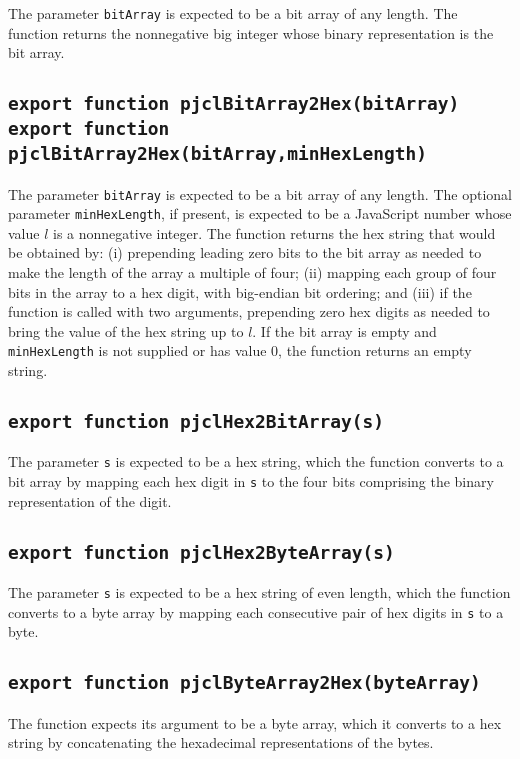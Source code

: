 \documentclass[12pt]{article}
\begin{document}
The parameter {\tt bitArray} is expected to be a bit array of any length.  The
function returns the nonnegative big integer whose binary representation is the
bit array.

\subsection{\tt export function pjclBitArray2Hex(bitArray)\\export function pjclBitArray2Hex(bitArray,minHexLength)}

The parameter {\tt bitArray} is expected to be a bit array of any length.  
The optional parameter {\tt minHexLength}, if present, is expected to be a JavaScript
number whose value $l$ is a nonnegative integer.  The
function returns the hex string that would be obtained by: (i) prepending leading zero
bits to the bit array as needed to make the length of the array a
multiple of four; (ii) mapping each group of four bits in the array to a hex digit,
with big-endian bit ordering; and (iii) if the function is called with two arguments,
prepending zero hex digits as needed to bring the value of the hex string up to $l$.
If the bit array is empty and {\tt minHexLength} is not supplied or has value 0,
the function returns an empty string.

\subsection{\tt export function pjclHex2BitArray(s)}

The parameter {\tt s} is expected to be a hex string, which the
function converts to a bit array by mapping each hex digit in {\tt s}
to the four bits comprising the binary representation of the digit.

\subsection{\tt export function pjclHex2ByteArray(s)}

The parameter {\tt s} is expected to be a hex string of even length, which the
function converts to a byte array by mapping each consecutive pair of
hex digits in {\tt s} to a byte.

\subsection{\tt export function pjclByteArray2Hex(byteArray)}

The function expects its argument to be a byte array, which it converts to a hex string 
by concatenating the hexadecimal representations of the bytes.
\end{document}
